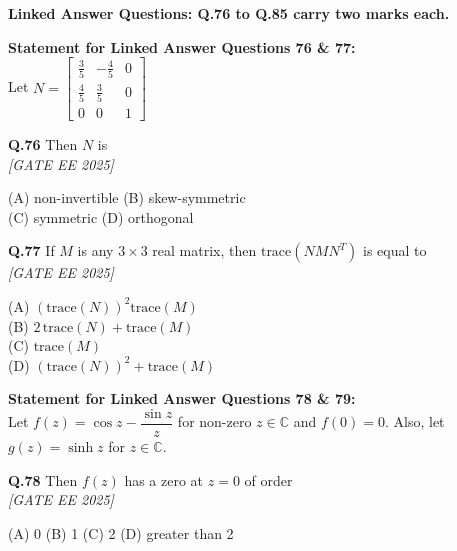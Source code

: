 \documentclass[11pt]{article}
\begin{document}
\bigskip

\noindent\textbf{Linked Answer Questions: Q.76 to Q.85 carry two marks each.}

\bigskip

\noindent\textbf{Statement for Linked Answer Questions 76 \& 77:} \\
Let $N = \begin{bmatrix} \frac{3}{5} & -\frac{4}{5} & 0 \\ \frac{4}{5} & \frac{3}{5} & 0 \\ 0 & 0 & 1 \end{bmatrix}$

\begin{flushleft}
\textbf{Q.76} Then $N$ is 
\\[1ex] \textit{[GATE EE 2025]}

(A) non-invertible \hspace{2em}
(B) skew-symmetric \\
(C) symmetric \hspace{2em}
(D) orthogonal
\end{flushleft}

\begin{flushleft}
\textbf{Q.77} If $M$ is any $3 \times 3$ real matrix, then $\text{trace}(NMN^T)$ is equal to 
\\[1ex] \textit{[GATE EE 2025]}

(A) $\left( \text{trace}(N) \right)^2 \text{trace}(M)$ \\
(B) $2\, \text{trace}(N) + \text{trace}(M)$ \\
(C) $\text{trace}(M)$ \\
(D) $\left( \text{trace}(N) \right)^2 + \text{trace}(M)$
\end{flushleft}

\bigskip

\noindent\textbf{Statement for Linked Answer Questions 78 \& 79:} \\
Let $f(z) = \cos z - \dfrac{\sin z}{z}$ for non-zero $z \in \mathbb{C}$ and $f(0) = 0$. Also, let $g(z) = \sinh z$ for $z \in \mathbb{C}$.

\begin{flushleft}
\textbf{Q.78} Then $f(z)$ has a zero at $z = 0$ of order 
\\[1ex] \textit{[GATE EE 2025]}

(A) 0 \hspace{2em} (B) 1 \hspace{2em} (C) 2 \hspace{2em} (D) greater than 2
\end{flushleft}
\end{document}
